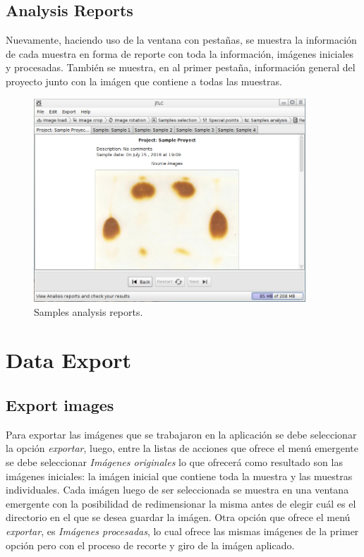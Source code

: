 \section{Analysis Reports}
Nuevamente, haciendo uso de la ventana con pesta\~nas, se muestra la informaci\'on de cada muestra en forma de reporte con toda la informaci\'on, im\'agenes iniciales y procesadas. Tambi\'en se muestra, en al primer pesta\~na, informaci\'on general del proyecto junto con la im\'agen que contiene a todas las muestras.
\begin{figure}[H]
	\vspace{0cm}
	\centering
	\includegraphics[width=385px]{imagenes/reports}
	\centering
	\vspace{-0.4cm}
	\caption{Samples analysis reports.}
	\label{fig:image_analysis_reports}
	\vspace{-0.25cm}
\end{figure}

\chapter{Data Export}
\section{Export images}
Para exportar las im\'agenes que se trabajaron en la aplicaci\'on se debe seleccionar la opción \emph{exportar}, luego, entre la listas de acciones que ofrece el men\'u emergente se debe seleccionar \emph{Im\'agenes originales} lo que ofrecer\'a como resultado son las im\'agenes iniciales: la im\'agen inicial que contiene toda la muestra y las muestras individuales. Cada im\'agen luego de ser seleccionada se muestra en una ventana emergente con la posibilidad de redimensionar la misma antes de elegir cu\'al es el directorio en el que se desea guardar la im\'agen.
Otra opci\'on que ofrece el men\'u \emph{exportar}, es \emph{Im\'agenes procesadas}, lo cual ofrece las mismas im\'agenes de la primer opci\'on pero con el proceso de recorte y giro de la im\'agen aplicado.

